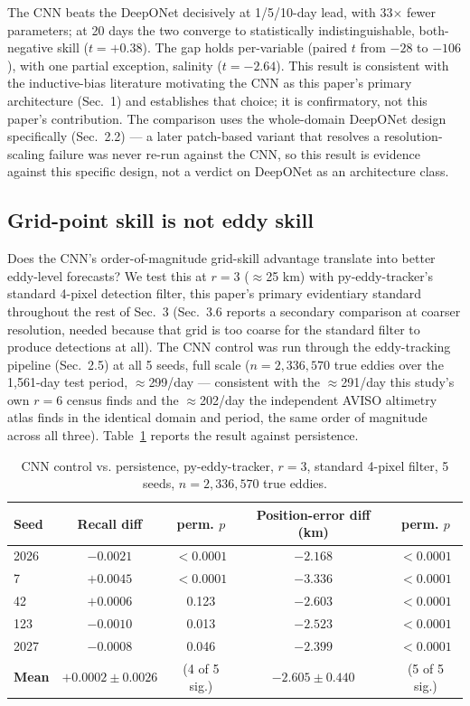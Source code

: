 \documentclass[11pt]{article}
\begin{document}
The CNN beats the DeepONet decisively at 1/5/10-day lead, with 33$\times$ fewer parameters; at 20 days the two converge to statistically indistinguishable, both-negative skill ($t=+0.38$). The gap holds per-variable (paired $t$ from $-28$ to $-106$), with one partial exception, salinity ($t=-2.64$). This result is consistent with the inductive-bias literature motivating the CNN as this paper's primary architecture (Sec.~1) and establishes that choice; it is confirmatory, not this paper's contribution. The comparison uses the whole-domain DeepONet design specifically (Sec.~2.2) --- a later patch-based variant that resolves a resolution-scaling failure was never re-run against the CNN, so this result is evidence against this specific design, not a verdict on DeepONet as an architecture class.

\subsection{Grid-point skill is not eddy skill}

Does the CNN's order-of-magnitude grid-skill advantage translate into better eddy-level forecasts? We test this at $r=3$ ($\approx$25 km) with py-eddy-tracker's standard 4-pixel detection filter, this paper's primary evidentiary standard throughout the rest of Sec.~3 (Sec.~3.6 reports a secondary comparison at coarser resolution, needed because that grid is too coarse for the standard filter to produce detections at all). The CNN control was run through the eddy-tracking pipeline (Sec.~2.5) at all 5 seeds, full scale ($n=2{,}336{,}570$ true eddies over the 1,561-day test period, $\approx$299/day --- consistent with the $\approx$291/day this study's own $r=6$ census finds and the $\approx$202/day the independent AVISO altimetry atlas finds in the identical domain and period, the same order of magnitude across all three). Table~\ref{tab:double_penalty_r3} reports the result against persistence.

\begin{table}[h]
\centering
\caption{CNN control vs. persistence, py-eddy-tracker, $r=3$, standard 4-pixel filter, 5 seeds, $n=2{,}336{,}570$ true eddies.}
\label{tab:double_penalty_r3}
\begin{tabular}{lcccc}
\toprule
Seed & Recall diff & perm. $p$ & Position-error diff (km) & perm. $p$ \\
\midrule
2026 & $-0.0021$ & $<0.0001$ & $-2.168$ & $<0.0001$ \\
7 & $+0.0045$ & $<0.0001$ & $-3.336$ & $<0.0001$ \\
42 & $+0.0006$ & 0.123 & $-2.603$ & $<0.0001$ \\
123 & $-0.0010$ & 0.013 & $-2.523$ & $<0.0001$ \\
2027 & $-0.0008$ & 0.046 & $-2.399$ & $<0.0001$ \\
\midrule
\textbf{Mean} & $\mathbf{+0.0002 \pm 0.0026}$ & (4 of 5 sig.) & $\mathbf{-2.605 \pm 0.440}$ & (5 of 5 sig.) \\
\bottomrule
\end{tabular}
\end{table}
\end{document}
